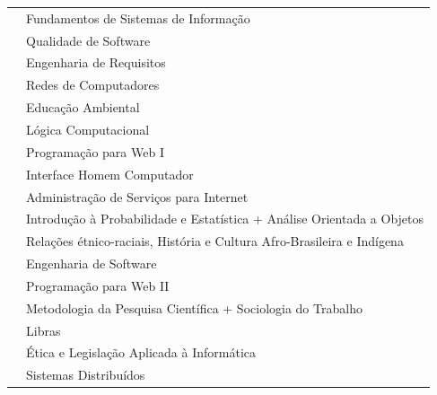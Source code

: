\documentclass[11pt,fleqn]{book} %
\begin{document}
\begin{table}[]
{\begin{tabular}{@{}l|l@{}}
			\nameref{3_nosql}               & Fundamentos de Sistemas de Informação                                     \\			
			\nameref{3_testsoft}            & Qualidade de Software                                                     \\
			\nameref{3_engreq}              & Engenharia de Requisitos                                                  \\
			\nameref{3_redescomp}           & Redes de Computadores                                                     \\
			\nameref{3_educamb}             & Educação Ambiental                                                        \\
			\nameref{3_projamb}             & Lógica Computacional                                                      \\ \midrule
			\nameref{4_ppw1}                & Programação para Web I                                                    \\
			\nameref{4_ihc}                 & Interface Homem Computador                                                \\
			\nameref{4_asi}                 & Administração de Serviços para Internet                                   \\
			\nameref{4_probest}             & Introdução à Probabilidade e Estatística + Análise Orientada a Objetos    \\
			\nameref{4_etnicoraciais}       & Relações étnico-raciais, História e Cultura Afro-Brasileira e Indígena    \\
			\nameref{4_projsoc}             & Engenharia de Software                                                    \\ \midrule			
			\nameref{5_ppw2}                & Programação para Web II                                                   \\
			\nameref{5_metodologia}         & Metodologia da Pesquisa Científica + Sociologia do Trabalho               \\
			\nameref{5_libras}              & Libras                                                                    \\
			\nameref{5_etica}               & Ética e Legislação Aplicada à Informática                                 \\
			\nameref{5_sd}                 & Sistemas Distribuídos                                                     \\

\end{tabular}}
\end{table}
\end{document}
